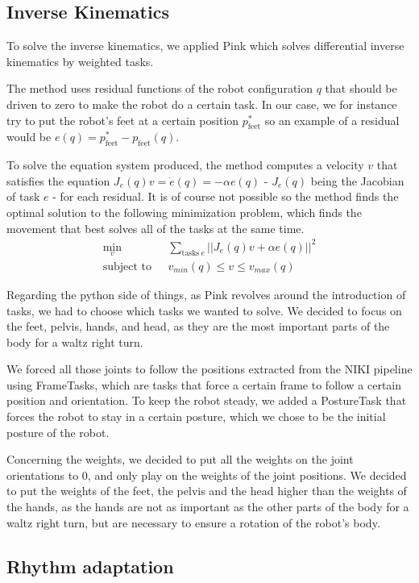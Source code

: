\documentclass{amsart}
\theoremstyle{definition}
\theoremstyle{plain}
\begin{document}
\subsection{Inverse Kinematics}
To solve the inverse kinematics, we applied Pink\cite{pink2024} which solves differential inverse kinematics by weighted tasks. 

The method uses residual functions of the robot configuration $q$ that should be driven to zero to make the robot do a certain task. In our case, we for instance try to put the robot's feet at a certain position $p_{\text{feet}}^*$ so an example of a residual would be $e(q) = p_{\text{feet}}^* - p_{\text{feet}}(q)$. 

To solve the equation system produced, the method computes a velocity $v$ that satisfies the equation $J_e(q)v = \dot{e}(q) = -\alpha e(q)$ - $J_e(q)$ being the Jacobian of task $e$ - for each residual. 
It is of course not possible so the method finds the optimal solution to the following minimization problem, which finds the movement that best solves all of the tasks at the same time.
$$
\begin{aligned}
\min_v \ \ &\sum_{\text{tasks} \ e} ||J_e(q)v + \alpha e(q)||^2 \\
\text{subject to} \ \ \ &v_{min}(q) \leq v \leq v_{max}(q)
\end{aligned}
$$

Regarding the python side of things, as Pink revolves around the introduction of tasks, we had to choose which tasks we wanted to solve. We decided to focus on the feet, pelvis, hands, and head, as they are the most important parts of the body for a waltz right turn. 

We forced all those joints to follow the positions extracted from the NIKI pipeline using FrameTasks, which are tasks that force a certain frame to follow a certain position and orientation. To keep the robot steady, we added a PostureTask that forces the robot to stay in a certain posture, which we chose to be the initial posture of the robot.

Concerning the weights, we decided to put all the weights on the joint orientations to 0, and only play on the weights of the joint positions. We decided to put the weights of the feet, the pelvis and the head higher than the weights of the hands, as the hands are not as important as the other parts of the body for a waltz right turn, but are necessary to ensure a rotation of the robot's body.

\subsection{Rhythm adaptation}
\end{document}
